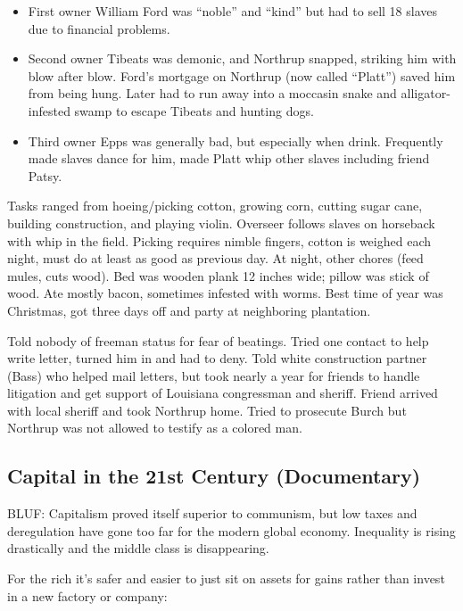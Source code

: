 \documentclass[
]{article}
\begin{document}
\begin{itemize}
\item
  First owner William Ford was ``noble'' and ``kind'' but had to sell 18
  slaves due to financial problems.
\item
  Second owner Tibeats was demonic, and Northrup snapped, striking him
  with blow after blow. Ford's mortgage on Northrup (now called
  ``Platt'') saved him from being hung. Later had to run away into a
  moccasin snake and alligator-infested swamp to escape Tibeats and
  hunting dogs.
\item
  Third owner Epps was generally bad, but especially when drink.
  Frequently made slaves dance for him, made Platt whip other slaves
  including friend Patsy.
\end{itemize}

Tasks ranged from hoeing/picking cotton, growing corn, cutting sugar
cane, building construction, and playing violin. Overseer follows slaves
on horseback with whip in the field. Picking requires nimble fingers,
cotton is weighed each night, must do at least as good as previous day.
At night, other chores (feed mules, cuts wood). Bed was wooden plank 12
inches wide; pillow was stick of wood. Ate mostly bacon, sometimes
infested with worms. Best time of year was Christmas, got three days off
and party at neighboring plantation.

Told nobody of freeman status for fear of beatings. Tried one contact to
help write letter, turned him in and had to deny. Told white
construction partner (Bass) who helped mail letters, but took nearly a
year for friends to handle litigation and get support of Louisiana
congressman and sheriff. Friend arrived with local sheriff and took
Northrup home. Tried to prosecute Burch but Northrup was not allowed to
testify as a colored man.

\hypertarget{capital-in-the-21st-century-documentary}{%
\subsection{Capital in the 21st Century
(Documentary)}\label{capital-in-the-21st-century-documentary}}

BLUF: Capitalism proved itself superior to communism, but low taxes and
deregulation have gone too far for the modern global economy. Inequality
is rising drastically and the middle class is disappearing.

For the rich it's safer and easier to just sit on assets for gains
rather than invest in a new factory or company:
\end{document}
